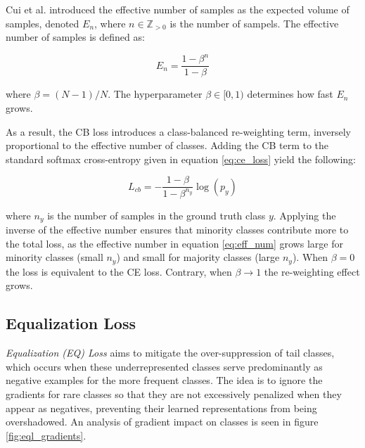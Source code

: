 Cui et al. \cite{cui2019classbalancedlossbasedeffective} introduced the effective number of samples as the expected volume of samples, denoted $E_n$, where $n \in \mathbb{Z}_{>0}$ is the number of sampels. The effective number of samples 
is defined as:

\begin{equation}
    \label{eq:eff_num}
    E_n = \frac{1-\beta^n}{1-\beta}
\end{equation}

where $\beta = (N-1)/N$. The hyperparameter $\beta \in [0,1)$ determines how fast $E_n$ grows.

As a result, the CB loss introduces a class-balanced re-weighting term, inversely proportional to the effective number of classes. Adding the CB term to the standard softmax cross-entropy given in equation \eqref{eq:ce_loss} yield the following:

\begin{equation}
    \label{eq:cb_loss}
    L_{cb} = - \frac{1 - \beta}{1 - \beta^{n_y}} \log(p_y)
\end{equation}

where $n_y$ is the number of samples in the ground truth class $y$. Applying the inverse of the effective number ensures that minority classes contribute more to the total loss, as the effective number in equation \eqref{eq:eff_num} grows large for minority classes (small $n_y$) and small for majority classes (large $n_y$). When $\beta = 0$ the loss is equivalent to the CE loss. Contrary, when $\beta \longrightarrow 1$ the re-weighting effect grows.




\subsection{Equalization Loss}
\label{sec:seql}
\emph{Equalization (EQ) Loss} \cite{tan2020equalizationlosslongtailedobject} aims to mitigate the over-suppression of tail classes, which occurs when these underrepresented classes serve predominantly as negative examples for the more frequent classes. The idea is to ignore the gradients for rare classes so that they are not excessively penalized when they appear as negatives, preventing their learned representations from being overshadowed. An analysis of gradient impact on classes is seen in figure \ref{fig:eql_gradients}.

